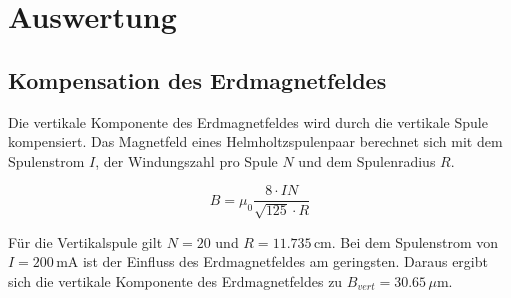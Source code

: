 \section{Auswertung}
\label{sec:Auswertung}

\subsection{Kompensation des Erdmagnetfeldes}
Die vertikale Komponente des Erdmagnetfeldes wird durch die vertikale Spule kompensiert.
Das Magnetfeld eines Helmholtzspulenpaar berechnet sich mit dem Spulenstrom $I$, der Windungszahl pro Spule $N$ und dem Spulenradius $R$.

\begin{equation}
  B = \mu_0\frac{8\cdot IN}{\sqrt{125}\cdot R}
  \label{eq:bfeld}
\end{equation}

Für die Vertikalspule gilt $N=20$ und $R=11.735\,$cm.
Bei dem Spulenstrom von $I=200\,$mA ist der Einfluss des Erdmagnetfeldes am geringsten.
Daraus ergibt sich die vertikale Komponente des Erdmagnetfeldes zu $B_{vert}=30.65\,\mu$m.

